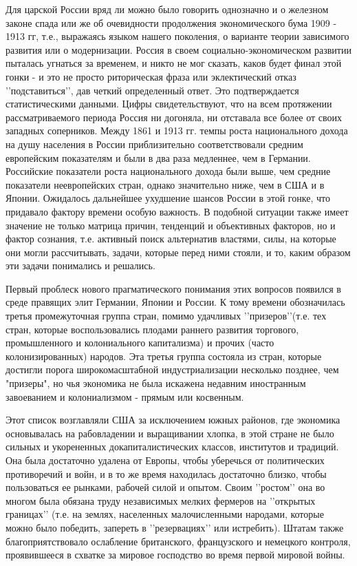 \documentclass[12pt]{article}
\begin{document}
Для царской России вряд ли можно было говорить однозначно и о железном законе спада или же об очевидности продолжения экономического бума 1909 - 1913 гг, т.е., выражаясь языком нашего поколения, о варианте теории зависимого развития или о модернизации. Россия в своем социально-экономическом развитии пыталась угнаться за временем, и никто не мог сказать, каков будет финал этой гонки - и это не просто риторическая фраза или эклектический отказ \rq\rq{}подставиться\rq\rq{}, дав четкий определенный ответ. Это подтверждается статистическими данными. Цифры свидетельствуют, что на всем протяжении рассматриваемого периода Россия ни догоняла, ни отставала все более от своих западных соперников. Между 1861 и 1913 гг. темпы роста национального дохода на душу населения в России приблизительно соответствовали средним европейским показателям и были в два раза медленнее, чем в Германии. Российские показатели роста национального дохода были выше, чем средние показатели неевропейских стран, однако значительно ниже, чем в США и в Японии. Ожидалось дальнейшее ухудшение шансов России в этой гонке, что придавало фактору времени особую важность. В подобной ситуации также имеет значение не только матрица причин, тенденций и объективных факторов, но и фактор сознания, т.е. активный поиск альтернатив властями, силы, на которые они могли рассчитывать, задачи, которые перед ними стояли, и то, каким образом эти задачи понимались и решались.

Первый проблеск нового прагматического понимания этих вопросов появился в среде правящих элит Германии, Японии и России. К тому времени обозначилась третья промежуточная группа стран, помимо удачливых \rq\rq{}призеров\rq\rq{}(т.е. тех стран, которые воспользовались плодами раннего развития торгового, промышленного и колониального капитализма) и прочих (часто колонизированных) народов. Эта третья группа состояла из стран, которые достигли порога широкомасштабной индустриализации несколько позднее, чем "призеры", но чья экономика не была искажена недавним иностранным завоеванием и колониализмом - прямым или косвенным.

Этот список возглавляли США за исключением южных районов, где экономика основывалась на рабовладении и выращивании хлопка, в этой стране не было сильных и укорененных докапиталистических классов, институтов и традиций. Она была достаточно удалена от Европы, чтобы уберечься от политических противоречий и войн, и в то же время находилась достаточно близко, чтобы пользоваться ее рынками, рабочей силой и опытом. Своим \rq\rq{}ростом\rq\rq{} она во многом была обязана труду независимых мелких фермеров на \rq\rq{}открытых границах\rq\rq{} (т.е. на землях, населенных малочисленными народами, которые можно было победить, запереть в \rq\rq{}резервациях\rq\rq{} или истребить). Штатам также благоприятствовало ослабление британского, французского и немецкого контроля, проявившееся в схватке за мировое господство во время первой мировой войны.
\end{document}
